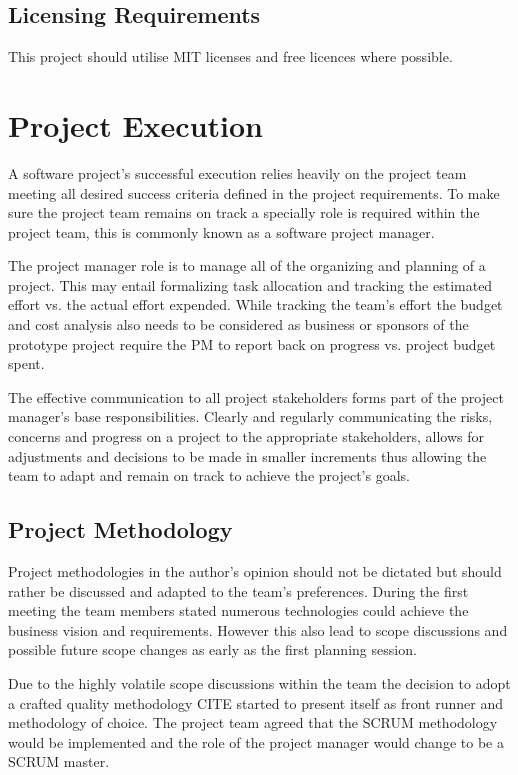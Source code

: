 \documentclass[12pt]{witseiepaper}
\begin{document}
\subsection{Licensing Requirements}
This project should utilise MIT licenses and free licences where possible.

\section{Project Execution}
A software project's successful execution relies heavily on the project team meeting all desired success criteria defined in the project requirements. To make sure the project team remains on track a specially role is required within the project team, this is commonly known as a software project manager. \cite{SPM}

The project manager role is to manage all of the organizing and planning of a project. This may entail formalizing task allocation and tracking the estimated effort vs. the actual effort expended.
While tracking the team’s effort the budget and cost analysis also needs to be considered as business or sponsors of the prototype project require the PM to report back on progress vs. project budget spent. \cite{ExpertJudgement}

The effective communication to all project stakeholders forms part of the project manager’s base responsibilities. Clearly and regularly communicating the risks, concerns and progress on a project to the appropriate stakeholders, allows for adjustments and decisions to be made in smaller increments thus allowing the team to adapt and remain on track to achieve the project’s goals.

\subsection{Project Methodology}
Project methodologies in the author's opinion should not be dictated but should rather be discussed and adapted to the team's preferences. During the first meeting the team members stated numerous technologies could achieve the business vision and requirements. However this also lead to scope discussions and possible future scope changes as early as the first planning session.

Due to the highly volatile scope discussions within the team the decision to adopt a crafted quality methodology CITE started to present itself as front runner and methodology of choice. The project team agreed that the SCRUM methodology \cite{ExpertJudgement} would be implemented and the role of the project manager would change to be a SCRUM master. \cite{SCUMMaster}
\end{document}
